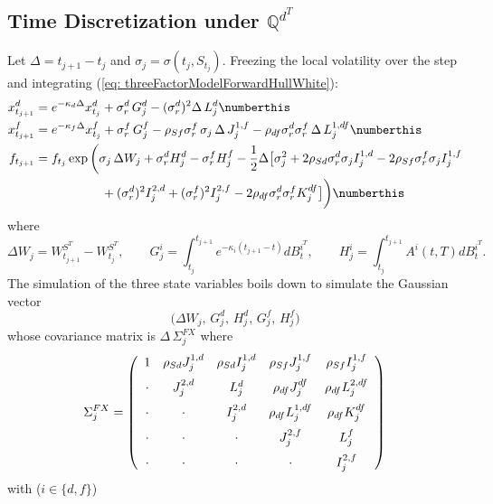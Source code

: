 \subsection{Time Discretization under $\mathbb{Q}^{d^T}$}\label{subsec: discretisation3F}
Let $\Delta=t_{j+1}-t_j$ and $\sigma_j=\sigma(t_j,S_{t_j})$. Freezing the local volatility over the step and integrating (\ref{eq: threeFactorModelForwardHullWhite}):
\begin{align*}
x^d_{t_{j+1}} ={}& e^{-\kappa_d\Delta}x^d_{t_j}+\sigma^d_r\,G^d_j-(\sigma^d_r)^2\Delta\,L^d_j \numberthis \label{eq: discretizationDomesticInterestRate}\\
x^f_{t_{j+1}} ={}& e^{-\kappa_f\Delta}x^f_{t_j}+\sigma^f_r\,G^f_j-\rho_{Sf}\sigma^f_r\,\sigma_j\,\Delta\,J^{1,f}_j-\rho_{df}\sigma^d_r\sigma^f_r\,\Delta\,L^{1,df}_j \numberthis \label{eq: discretizationForeignInterestRate}\\
f_{t_{j+1}} ={}&  f_{t_j}\exp\bigg( \sigma_j\,\Delta W_j + \sigma^d_r H^d_j - \sigma^f_r H^f_j
 - \frac{1}{2}\Delta\big[\sigma_j^2 + 2\rho_{Sd}\sigma^d_r\sigma_jI^{1,d}_j - 2\rho_{Sf}\sigma^f_r\sigma_jI^{1,f}_j   \\
& \qquad\qquad + (\sigma^d_r)^2 I^{2,d}_j + (\sigma^f_r)^2 I^{2,f}_j - 2\rho_{df} \sigma^d_r\sigma^f_rK^{df}_j\big]
\bigg) \numberthis \label{eq: discretizationForward3F}
\end{align*}
where
$$\Delta W_j=W^{S^T}_{t_{j+1}}-W^{S^T}_{t_{j}},\qquad G^i_j=\int_{t_j}^{t_{j+1}}e^{-\kappa_i(t_{j+1}-t) }dB_t^{i^T},\qquad H^i_j=\int_{t_j}^{t_{j+1}} A^i(t,T) dB_t^{i^T}. $$
The simulation of the three state variables boils down to simulate the Gaussian vector
$$\big(\Delta W_j,\,G^d_j,\,H^d_j,\,G^f_j,\,H^f_j\big)$$
whose covariance matrix is $\Delta\,\Sigma_j^{FX}$ where
\[\Sigma_j^{FX}= \left( \begin{array}{ccccc}
1 & \rho_{Sd} J_j^{1,d} & \rho_{Sd} I^{1,d}_j & \rho_{Sf} J_j^{1,f} & \rho_{Sf} I^{1,f}_j \medskip\\
\cdot & J_j^{2,d} & L_j^d & \rho_{df}J_j^{df} & \rho_{df}L^{2,df}_j \medskip\\
\cdot & \cdot & I^{2,d}_j & \rho_{df}L^{1,df}_j & \rho_{df}K^{df}_j \medskip\\
\cdot & \cdot & \cdot & J_j^{2,f} & L_j^f  \medskip\\
\cdot & \cdot & \cdot & \cdot & I^{2,f}_j
\end{array} \right)\]
with ($i\in \{d,f\}$)
